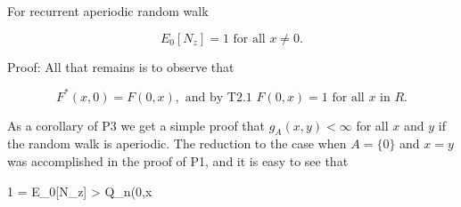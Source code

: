 For recurrent aperiodic random walk

$$E_0[N_z] = 1 \text{ for all } x \neq 0.$$

Proof: All that remains is to observe that

$$F^*(x,0) = F(0,x), \text{ and by T2.1 } F(0,x) = 1 \text{ for all } x \text{ in } R.$$

As a corollary of P3 we get a simple proof that $g_A(x,y) < \infty$ for all $x$ and $y$ if the random walk is aperiodic. The reduction to the case when $A = \{0\}$ and $x = y$ was accomplished in the proof of P1, and it is easy to see that

$$1 = E_0[N_z] > Q_n(0,x